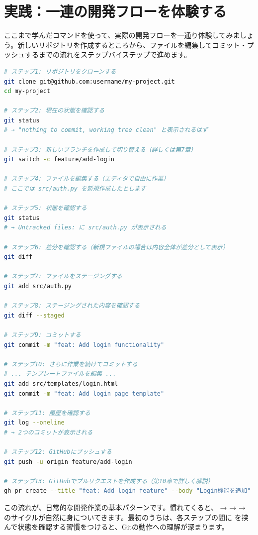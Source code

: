 \section{実践：一連の開発フローを体験する}

ここまで学んだコマンドを使って、実際の開発フローを一通り体験してみましょう。新しいリポジトリを作成するところから、ファイルを編集してコミット・プッシュするまでの流れをステップバイステップで進めます。

\begin{lstlisting}[language=bash]
# ステップ1: リポジトリをクローンする
git clone git@github.com:username/my-project.git
cd my-project

# ステップ2: 現在の状態を確認する
git status
# → "nothing to commit, working tree clean" と表示されるはず

# ステップ3: 新しいブランチを作成して切り替える（詳しくは第7章）
git switch -c feature/add-login

# ステップ4: ファイルを編集する（エディタで自由に作業）
# ここでは src/auth.py を新規作成したとします

# ステップ5: 状態を確認する
git status
# → Untracked files: に src/auth.py が表示される

# ステップ6: 差分を確認する（新規ファイルの場合は内容全体が差分として表示）
git diff

# ステップ7: ファイルをステージングする
git add src/auth.py

# ステップ8: ステージングされた内容を確認する
git diff --staged

# ステップ9: コミットする
git commit -m "feat: Add login functionality"

# ステップ10: さらに作業を続けてコミットする
# ... テンプレートファイルを編集 ...
git add src/templates/login.html
git commit -m "feat: Add login page template"

# ステップ11: 履歴を確認する
git log --oneline
# → 2つのコミットが表示される

# ステップ12: GitHubにプッシュする
git push -u origin feature/add-login

# ステップ13: GitHubでプルリクエストを作成する（第10章で詳しく解説）
gh pr create --title "feat: Add login feature" --body "Login機能を追加"
\end{lstlisting}

この流れが、日常的な開発作業の基本パターンです。慣れてくると、 →  →  →  のサイクルが自然に身についてきます。最初のうちは、各ステップの間に  を挟んで状態を確認する習慣をつけると、Gitの動作への理解が深まります。

